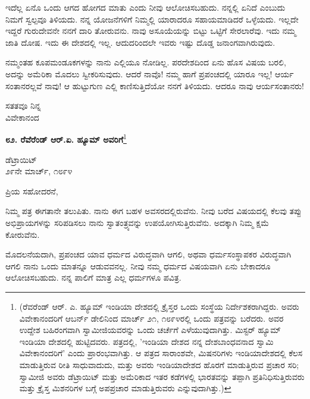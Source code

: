 \vspace{0.2cm}

ಇದೆಲ್ಲ ಏನೊ ಒಂದು ಆಗದ ಹೋಗದ ಮಾತು ಎಂದು ನೀವು ಆಲೋಚಿಸಬಹುದು. ನನ್ನಲ್ಲಿ ಏನಿದೆ ಎಂಬುದು ನಿಮಗೆ ಸ್ವಲ್ಪವೂ ತಿಳಿಯದು. ನನ್ನ ಯೋಜನೆಗಳಿಗೆ ನಿಮ್ಮಲ್ಲಿ ಯಾರಾದರೂ ಸಹಾಯಮಾಡಿದರೆ ಒಳ್ಳೆಯದು. ಇಲ್ಲದೇ ಇದ್ದರೆ ಗುರುದೇವನೇ ನನಗೆ ದಾರಿ ತೋರುವನು. ನಾವು ಅಸೂಯೆಯನ್ನು ಬಿಟ್ಟು ಒಟ್ಟಿಗೆ ಸೇರಲಾರೆವು. ಇದು ನಮ್ಮ ಜಾತಿ ದೋಷ. ಇದು ಈ ದೇಶದಲ್ಲಿ ಇಲ್ಲ. ಆದುದರಿಂದಲೇ ಇವರು ಇಷ್ಟು ದೊಡ್ಡ ಜನಾಂಗವಾಗಿರುವುದು.

\vspace{0.3cm}

ನಮ್ಮಂತಹ ಕೂಪಮಂಡೂಕಗಳನ್ನು ನಾನು ಎಲ್ಲಿಯೂ ನೋಡಿಲ್ಲ. ಪರದೇಶದಿಂದ ಏನು ಹೊಸ ವಿಷಯ ಬರಲಿ, ಅದನ್ನು ಅಮೆರಿಕಾ ಮೊದಲು ಸ್ವೀಕರಿಸುವುದು. ಆದರೆ ನಾವೊ! ನಮ್ಮ ಹಾಗೆ ಪ್ರಪಂಚದಲ್ಲಿ ಯಾರೂ ಇಲ್ಲ! ಆರ್ಯ ಸಂತಾನರಲ್ಲವೆ ನಾವು! ಆ ಹುಟ್ಟುಗುಣ ಎಲ್ಲಿ ಕಾಣಿಸುತ್ತಿದೆಯೋ ನನಗೆ ತಿಳಿಯದು. ಆದರೂ ನಾವು ಆರ್ಯಸಂತಾನರು!
\vspace{0.3cm}

{\flushright
ಸತತವೂ ನಿನ್ನ\\ವಿವೇಕಾನಂದ\par}
\newpage

\begin{center}
\textbf{೮೨. ರೆವೆರೆಂಡ್ ಆರ್.ಏ. ಹ್ಯೂಮ್ ಅವರಿಗೆ}\footnote{(ರೆವರೆಂಡ್ ಆರ್. ಎ. ಹ್ಯೂಮ್ ಇಂಡಿಯಾ ದೇಶದಲ್ಲಿ ಕ್ರೈಸ್ತರ ಒಂದು ಸಂಸ್ಥೆಯ ನಿರ್ದೇಶಕರಾಗಿದ್ದರು. ಅವರು ವಿವೇಕಾನಂದರಿಗೆ ಆಬರ್ನ್ ಡೇಲಿನಿಂದ ಮಾರ್ಚ್ ೨೧, ೧೮೯೪ರಲ್ಲಿ ಒಂದು ಪತ್ರವನ್ನು ಬರೆದರು. ಅವರ ಉದ್ದೇಶ ಬಹಿರಂಗವಾಗಿ ಸ್ವಾಮೀಜಿಯವರನ್ನು ಒಂದು ಚರ್ಚೆಗೆ ಎಳೆಯುವುದಾಗಿತ್ತು. ಮಿಸ್ಟರ್ ಹ್ಯೂಮ್ ಇಂಡಿಯಾ ದೇಶದಲ್ಲಿ ಹುಟ್ಟಿದವರು. ಪತ್ರದಲ್ಲಿ, ’ಇಂಡಿಯಾ ದೇಶದ ನನ್ನ ದೇಶಬಾಂಧವನಾದ ಸ್ವಾಮಿ ವಿವೇಕಾನಂದರಿಗೆ’ ಎಂದು ಪ್ರಾರಂಭವಾಗಿತ್ತು. ಆ ಪತ್ರದ ಸಾರಾಂಶವೇ, ಮಿಷನರಿಗಳು ಇಂಡಿಯಾದೇಶದಲ್ಲಿ ಕೆಲಸ ಮಾಡುತ್ತಿರುವ ರೀತಿ ಸಾಧುವಾದುದು, ಮತ್ತು ಅವರು ಇಂಡಿಯಾದೇಶದ ಹೊರಗೆ ಮಾಡುತ್ತಿರುವ ಪ್ರಚಾರ ಸರಿ; ಸ್ವಾಮೀಜಿ ಅವರು ಡೆಟ್ರಾಯಿಟ್ ಮತ್ತು ಅಮೆರಿಕಾದ ಇತರ ಕಡೆಗಳಲ್ಲಿ ಭಾರತವನ್ನು ತಪ್ಪಾಗಿ ಪ್ರತಿನಿಧಿಸುತ್ತಿರುವರು ಮತ್ತು ಕ್ರೈಸ್ತ ಮಿಶನರಿಗಳ ಬಗ್ಗೆ ಅಪಪ್ರಚಾರ ಮಾಡುತ್ತಿರುವರು ಎನ್ನುವುದಾಗಿತ್ತು.)

}
\end{center}

\begin{flushright}
ಡೆಟ್ರಾಯಿಟ್\\೨೯ನೇ ಮಾರ್ಚ್, ೧೮೯೪
\end{flushright}

\noindent
ಪ್ರಿಯ ಸಹೋದರನೆ,

ನಿಮ್ಮ ಪತ್ರ ಈಗತಾನೇ ತಲುಪಿತು. ನಾನು ಈಗ ಬಹಳ ಅವಸರದಲ್ಲಿರುವೆನು. ನೀವು ಬರೆದ ವಿಷಯದಲ್ಲಿ ಕೆಲವು ತಪ್ಪು ಅಭಿಪ್ರಾಯಗಳನ್ನು ಸರಿಪಡಿಸಲು ನಾನು ಸ್ವಾತಂತ್ರ್ಯವನ್ನು ಉಪಯೋಗಿಸುತ್ತಿರುವೆನು. ಅದಕ್ಕಾಗಿ ನಿಮ್ಮ ಕ್ಷಮೆ ಕೋರುವೆನು.

ಮೊದಲನೆಯದಾಗಿ, ಪ್ರಪಂಚದ ಯಾವ ಧರ್ಮದ ವಿರುದ್ಧವಾಗಿ ಆಗಲಿ, ಅಥವಾ ಧರ್ಮಸಂಸ್ಥಾಪಕರ ವಿರುದ್ಧವಾಗಿ ಆಗಲಿ ನಾನು ಒಂದು ಮಾತನ್ನೂ ಆಡುವವನಲ್ಲ. ನೀವು ನಮ್ಮ ಧರ್ಮದ ವಿಷಯವಾಗಿ ಏನು ಬೇಕಾದರೂ ಆಲೋಚಿಸಬಹುದು. ನನ್ನ ಪಾಲಿಗೆ ಮಾತ್ರ ಎಲ್ಲ ಧರ್ಮಗಳೂ ಪವಿತ್ರ.

